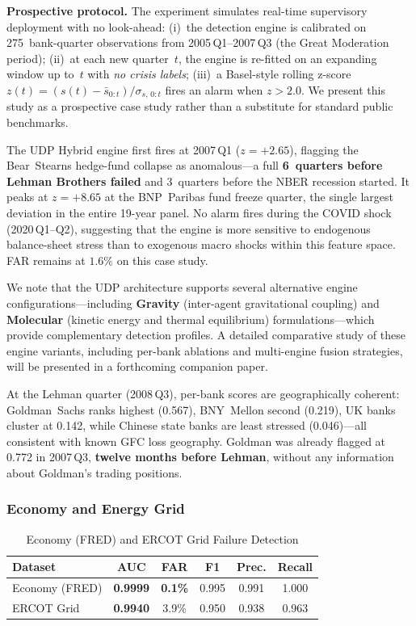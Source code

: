 \documentclass[journal]{IEEEtran}
\begin{document}
\textbf{Prospective protocol.} The experiment simulates real-time supervisory deployment with no look-ahead: (i)~the detection engine is calibrated on 275~bank-quarter observations from 2005\,Q1--2007\,Q3 (the Great Moderation period); (ii)~at each new quarter~$t$, the engine is re-fitted on an expanding window up to~$t$ with \emph{no crisis labels}; (iii)~a Basel-style rolling z-score $z(t) = (s(t) - \bar{s}_{0:t})/\sigma_{s,\,0:t}$ fires an alarm when $z > 2.0$.  We present this study as a prospective case study rather than a substitute for standard public benchmarks.

The UDP Hybrid engine first fires at 2007\,Q1 ($z{=}+2.65$), flagging the Bear~Stearns hedge-fund collapse as anomalous---a full \textbf{6~quarters before Lehman Brothers failed} and 3~quarters before the NBER recession started. It peaks at $z{=}+8.65$ at the BNP~Paribas fund freeze quarter, the single largest deviation in the entire 19-year panel. No alarm fires during the COVID shock (2020\,Q1--Q2), suggesting that the engine is more sensitive to endogenous balance-sheet stress than to exogenous macro shocks within this feature space. FAR remains at $1.6\%$ on this case study.

We note that the UDP architecture supports several alternative engine configurations---including \textbf{Gravity} (inter-agent gravitational coupling) and \textbf{Molecular} (kinetic energy and thermal equilibrium) formulations---which provide complementary detection profiles. A detailed comparative study of these engine variants, including per-bank ablations and multi-engine fusion strategies, will be presented in a forthcoming companion paper.

At the Lehman quarter (2008\,Q3), per-bank scores are geographically coherent: Goldman~Sachs ranks highest (0.567), BNY~Mellon second (0.219), UK banks cluster at 0.142, while Chinese state banks are least stressed (0.046)---all consistent with known GFC loss geography. Goldman was already flagged at 0.772 in 2007\,Q3, \textbf{twelve months before Lehman}, without any information about Goldman's trading positions.

\subsubsection{Economy and Energy Grid}
\label{sssec:economy_ercot}

\begin{table}[!t]
\centering
\caption{Economy (FRED) and ERCOT Grid Failure Detection}
\label{tab:economy_ercot}
\begin{tabular}{@{}lccccc@{}}
\toprule
\textbf{Dataset} & \textbf{AUC} & \textbf{FAR} & \textbf{F1} & \textbf{Prec.} & \textbf{Recall} \\
\midrule
Economy (FRED) & \textbf{0.9999} & \textbf{0.1\%} & 0.995 & 0.991 & 1.000 \\
ERCOT Grid & \textbf{0.9940} & 3.9\% & 0.950 & 0.938 & 0.963 \\
\bottomrule
\end{tabular}
\end{table}
\end{document}
